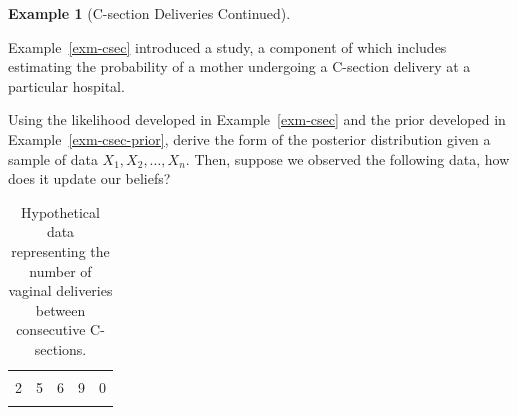 \documentclass[
  letterpaper,
  DIV=11,
  numbers=noendperiod]{scrreprt}
\theoremstyle{definition}
\newtheorem{example}{Example}[chapter]
\theoremstyle{definition}
\theoremstyle{plain}
\theoremstyle{remark}
\begin{document}
\begin{example}[C-section Deliveries
Continued]\protect\hypertarget{exm-csec-posterior}{}\label{exm-csec-posterior}

Example~\ref{exm-csec} introduced a study, a component of which includes
estimating the probability of a mother undergoing a C-section delivery
at a particular hospital.

Using the likelihood developed in Example~\ref{exm-csec} and the prior
developed in Example~\ref{exm-csec-prior}, derive the form of the
posterior distribution given a sample of data \(X_1, X_2, \dotsc, X_n\).
Then, suppose we observed the following data, how does it update our
beliefs?

\hypertarget{tbl-csec-data}{}
\begin{table}
\caption{\label{tbl-csec-data}Hypothetical data representing the number of vaginal deliveries between
consecutive C-sections. }\tabularnewline

\centering
\begin{tabular}[t]{rrrrr}
\toprule
\cellcolor{gray!6}{3} & \cellcolor{gray!6}{1} & \cellcolor{gray!6}{0} & \cellcolor{gray!6}{0} & \cellcolor{gray!6}{0}\\
2 & 5 & 6 & 9 & 0\\
\cellcolor{gray!6}{5} & \cellcolor{gray!6}{1} & \cellcolor{gray!6}{0} & \cellcolor{gray!6}{1} & \cellcolor{gray!6}{0}\\
\bottomrule
\end{tabular}
\end{table}

\end{example}
\end{document}
